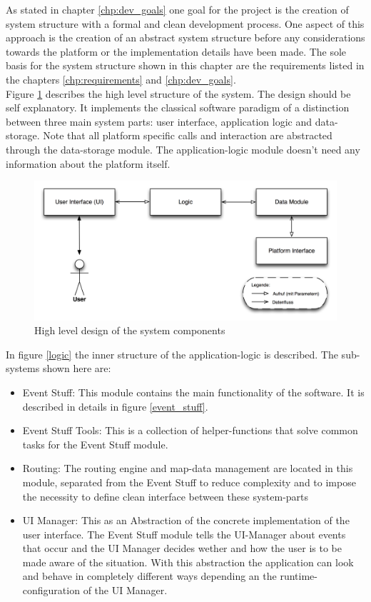 As stated in chapter \ref{chp:dev_goals}  one goal for the project is the creation of system structure with a formal and clean development process. One aspect of this approach is the creation of an abstract system structure before any considerations towards the platform or the implementation details have been made. The sole basis for the system structure shown in this chapter are the requirements listed in the chapters \ref{chp:requirements} and \ref{chp:dev_goals}.\\
Figure \ref{high_level_design} describes  the high level structure of the system. The design should be self explanatory. It implements the classical software paradigm of a distinction between three main system parts: user interface, application logic and data-storage. Note that all platform specific calls and interaction are abstracted through the data-storage module. The application-logic module doesn't need any information about the platform itself. 
\begin{figure}[h!]
\centering
\includegraphics[width=16cm]{pics/top_level_design.png}
\caption{High level design of the system components}
\label{high_level_design}
\end{figure}
In figure \ref{logic} the inner structure of the application-logic is described. The sub-systems shown here are:
\begin{itemize}
\item Event Stuff: This module contains the main functionality of the software. It is described in details in figure \ref{event_stuff}.
\item Event Stuff Tools: This is a collection of helper-functions that solve common tasks for the Event Stuff module.
\item Routing: The routing engine and map-data management are located in this module, separated from the Event Stuff to reduce complexity and to impose the necessity to define clean interface between these system-parts
\item UI Manager: This as an Abstraction of the concrete implementation of the user interface. The Event Stuff module tells the UI-Manager about events that occur and the  UI Manager decides wether and how the user is to be made aware of the situation. With this abstraction the application can look and behave in completely different ways depending an the runtime-configuration of the UI Manager.  
\end{itemize}
